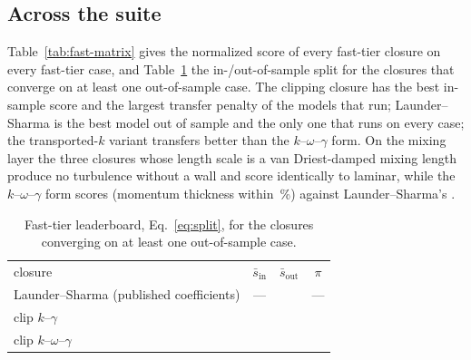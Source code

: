 \documentclass[lineno]{jfm}
\begin{document}
\subsection{Across the suite}\label{sec:generality}

Table~\ref{tab:fast-matrix} gives the normalized score of every fast-tier
closure on every fast-tier case, and Table~\ref{tab:leaderboard} the
in-/out-of-sample split for the closures that converge on at least one
out-of-sample case. The clipping closure has the best in-sample score and
the largest transfer penalty of the models that run; Launder--Sharma is the
best model out of sample and the only one that runs on every case; the
transported-$k$ variant transfers better than the $k$--$\omega$--$\gamma$
form. On the mixing layer the three closures whose length scale is a van
Driest-damped mixing length produce no turbulence without a wall and score
identically to laminar, while the $k$--$\omega$--$\gamma$ form scores
 (momentum thickness within
\,\%) against
Launder--Sharma's .

\begin{table}
  \begin{center}
  \footnotesize
  \fastTierMatrix
  \caption{Fast tier: normalized score of Eq.~\ref{eq:score} for every
    closure on every case. $^*$in sample; div.\ = diverged or not converged.
    LS+ML$_1$ and LS+ML$_4$ are Launder--Sharma with the momentum library
    fitted on the plate and on four cases.}
  \label{tab:fast-matrix}
  \end{center}
\end{table}

\begin{table}
  \begin{center}
  \begin{tabular}{lccc}
    closure & $\bar{s}_{\mathrm{in}}$ & $\bar{s}_{\mathrm{out}}$ & $\pi$ \\[3pt]
    Launder--Sharma (published coefficients) & --- &  & --- \\
    clip $k$--$\gamma$ &  &  &  \\
    clip $k$--$\omega$--$\gamma$ &  &  &  \\
  \end{tabular}
  \caption{Fast-tier leaderboard, Eq.~\ref{eq:split}, for the closures
    converging on at least one out-of-sample case.}
  \label{tab:leaderboard}
  \end{center}
\end{table}
\end{document}
